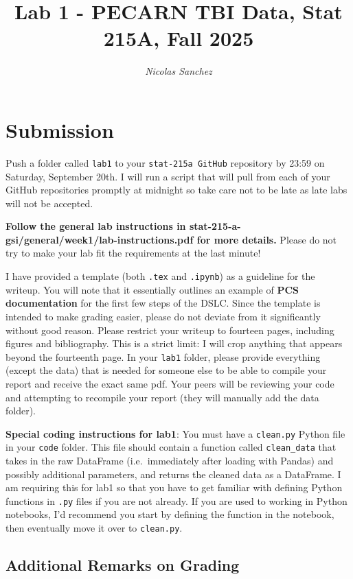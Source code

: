 \documentclass[10pt,letterpaper]{article}
\title{Lab 1 - PECARN TBI Data, Stat 215A, Fall 2025}
\author{\textit{Nicolas Sanchez}}
\begin{document}
\maketitle

\section*{Submission}
Push a folder called \texttt{lab1} to your \texttt{stat-215a GitHub} repository by 23:59 on Saturday, September 20th. I will run a script that will pull from each of your GitHub repositories promptly at midnight so take care not to be late as late labs will not be accepted.

\textbf{Follow the general lab instructions in stat-215-a-gsi/general/week1/lab-instructions.pdf for more details.} Please do not try to make your lab fit the requirements at the last minute!

I have provided a template (both \texttt{.tex} and \texttt{.ipynb}) as a guideline for the writeup. You will note that it essentially outlines an example of \textbf{PCS documentation} for the first few steps of the DSLC. Since the template is intended to make grading easier, please do not deviate from it significantly without good reason. Please restrict your writeup to fourteen pages, including figures and bibliography. This is a strict limit: I will crop anything that appears beyond the fourteenth page. In your \texttt{lab1} folder, please provide everything (except the data) that is needed for someone else to be able to compile your report and receive the exact same pdf. Your peers will be reviewing your code and attempting to recompile your report (they will manually add the data folder).

\textbf{Special coding instructions for lab1}: You must have a \texttt{clean.py} Python file in your \texttt{code} folder. This file should contain a function called \texttt{clean\_data} that takes in the raw DataFrame (i.e.~immediately after loading with Pandas) and possibly additional parameters, and returns the cleaned data as a DataFrame. I am requiring this for lab1 so that you have to get familiar with defining Python functions in \texttt{.py} files if you are not already. If you are used to working in Python notebooks, I'd recommend you start by defining the function in the notebook, then eventually move it over to \texttt{clean.py}.

\subsection*{Additional Remarks on Grading}
\end{document}
